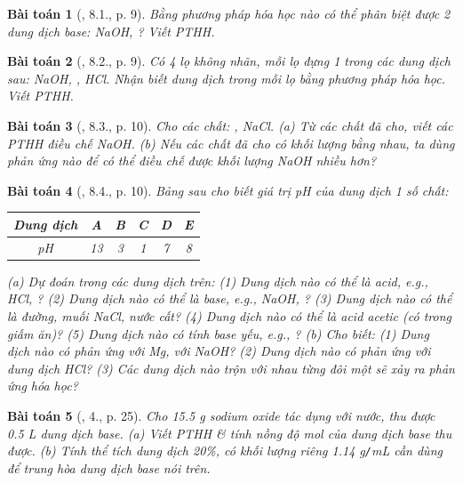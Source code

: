 \documentclass{article}
\newtheorem{baitoan}{Bài toán}
\begin{document}
\begin{baitoan}[\cite{SGK_Hoa_Hoc_9}, 8.1., p. 9]
	Bằng phương pháp hóa học nào có thể phân biệt được 2 dung dịch base: {\rm NaOH, }? Viết PTHH.
\end{baitoan}

\begin{baitoan}[\cite{SGK_Hoa_Hoc_9}, 8.2., p. 9]
	Có 4 lọ không nhãn, mỗi lọ đựng 1 trong các dung dịch sau: {\rm NaOH, , HCl}. Nhận biết dung dịch trong mỗi lọ bằng phương pháp hóa học. Viết {\rm PTHH}.
\end{baitoan}

\begin{baitoan}[\cite{SGK_Hoa_Hoc_9}, 8.3., p. 10]
	Cho các chất: {\rm{}, NaCl}. (a) Từ các chất đã cho, viết các PTHH điều chế {\rm NaOH}. (b) Nếu các chất đã cho có khối lượng bằng nhau, ta dùng phản ứng nào để có thể điều chế được khối lượng {\rm NaOH} nhiều hơn?
\end{baitoan}

\begin{baitoan}[\cite{SGK_Hoa_Hoc_9}, 8.4., p. 10]
	Bảng sau cho biết giá trị pH của dung dịch 1 số chất:
	\begin{table}[H]
		\centering
		\begin{tabular}{|c|c|c|c|c|c|}
			\hline
			Dung dịch & A & B & C & D & E \\
			\hline
			pH & 13 & 3 & 1 & 7 & 8 \\
			\hline
		\end{tabular}
	\end{table}
	\noindent(a) Dự đoán trong các dung dịch trên: (1) Dung dịch nào có thể là acid, e.g., {\rm HCl, }? (2) Dung dịch nào có thể là base, e.g., {\rm NaOH, }? (3) Dung dịch nào có thể là đường, muối {\rm NaCl}, nước cất? (4) Dung dịch nào có thể là acid acetic (có trong giấm ăn)? (5) Dung dịch nào có tính base yếu, e.g., {\rm{}}? (b) Cho biết: (1) Dung dịch nào có phản ứng với {\rm Mg}, với {\rm NaOH}? (2) Dung dịch nào có phản ứng với dung dịch {\rm HCl}? (3) Các dung dịch nào trộn với nhau từng đôi một sẽ xảy ra phản ứng hóa học?	
\end{baitoan}

\begin{baitoan}[\cite{SGK_Hoa_Hoc_9}, 4., p. 25]
	Cho {\rm15.5 g} sodium oxide {\rm{}} tác dụng với nước, thu được {\rm0.5 L} dung dịch base. (a) Viết PTHH \& tính nồng độ mol của dung dịch base thu được. (b) Tính thể tích dung dịch {\rm{} 20\%}, có khối lượng riêng {\rm1.14 g{\tt/}mL} cần dùng để trung hòa dung dịch base nói trên.
\end{baitoan}
\end{document}
